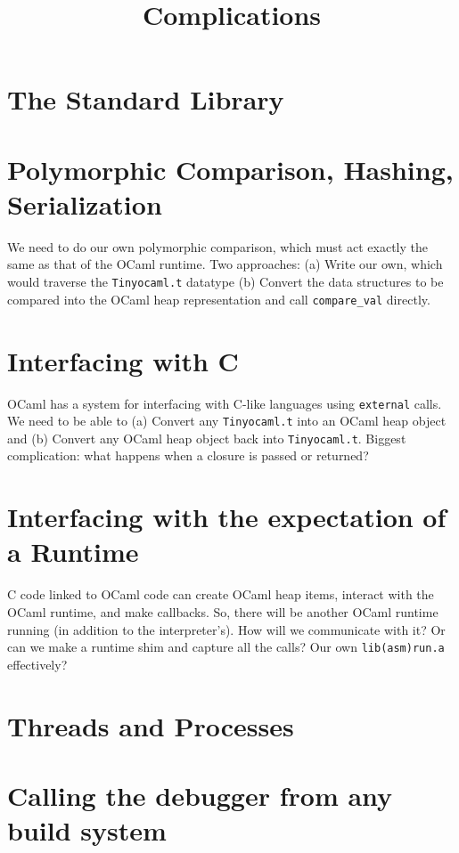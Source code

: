 \documentclass[10pt]{article}
\begin{document}
\title{Complications}
\maketitle

\section*{The Standard Library}

\section*{Polymorphic Comparison, Hashing, Serialization}

We need to do our own polymorphic comparison, which must act exactly the same as that of the OCaml runtime. Two approaches: (a) Write our own, which would traverse the \texttt{Tinyocaml.t} datatype (b) Convert the data structures to be compared into the OCaml heap representation and call \texttt{compare\_val} directly.

\section*{Interfacing with C}

OCaml has a system for interfacing with C-like languages using \texttt{external} calls. We need to be able to (a) Convert any \texttt{Tinyocaml.t} into an OCaml heap object and (b) Convert any OCaml heap object back into \texttt{Tinyocaml.t}. Biggest complication: what happens when a closure is passed or returned?

\section*{Interfacing with the expectation of a Runtime}

C code linked to OCaml code can create OCaml heap items, interact with the OCaml runtime, and make callbacks. So, there will be another OCaml runtime running (in addition to the interpreter's). How will we communicate with it? Or can we make a runtime shim and capture all the calls? Our own \texttt{lib(asm)run.a} effectively?

\section*{Threads and Processes}

\section*{Calling the debugger from any build system}
\end{document}
